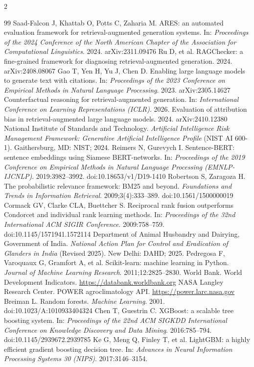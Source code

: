 \documentclass[10pt,openany]{report}
\begin{document}
\begin{multicols}{2}
\begin{thebibliography}{99}
 Saad-Falcon J, Khattab O, Potts C, Zaharia M. ARES: an automated evaluation framework for retrieval-augmented generation systems. In: \emph{Proceedings of the 2024 Conference of the North American Chapter of the Association for Computational Linguistics}. 2024. arXiv:2311.09476
 Ru D, et al. RAGChecker: a fine-grained framework for diagnosing retrieval-augmented generation. 2024. arXiv:2408.08067
 Gao T, Yen H, Yu J, Chen D. Enabling large language models to generate text with citations. In: \emph{Proceedings of the 2023 Conference on Empirical Methods in Natural Language Processing}. 2023. arXiv:2305.14627
 Counterfactual reasoning for retrieval-augmented generation. In: \emph{International Conference on Learning Representations (ICLR)}. 2026.
 Evaluation of attribution bias in retrieval-augmented large language models. 2024. arXiv:2410.12380
 National Institute of Standards and Technology. \emph{Artificial Intelligence Risk Management Framework: Generative Artificial Intelligence Profile} (NIST AI 600-1). Gaithersburg, MD: NIST; 2024.
 Reimers N, Gurevych I. Sentence-BERT: sentence embeddings using Siamese BERT-networks. In: \emph{Proceedings of the 2019 Conference on Empirical Methods in Natural Language Processing (EMNLP-IJCNLP)}. 2019:3982--3992. doi:10.18653/v1/D19-1410
 Robertson S, Zaragoza H. The probabilistic relevance framework: BM25 and beyond. \emph{Foundations and Trends in Information Retrieval}. 2009;3(4):333--389. doi:10.1561/1500000019
 Cormack GV, Clarke CLA, Buettcher S. Reciprocal rank fusion outperforms Condorcet and individual rank learning methods. In: \emph{Proceedings of the 32nd International ACM SIGIR Conference}. 2009:758--759. doi:10.1145/1571941.1572114
 Department of Animal Husbandry and Dairying, Government of India. \emph{National Action Plan for Control and Eradication of Glanders in India} (Revised 2025). New Delhi: DAHD; 2025.
 Pedregosa F, Varoquaux G, Gramfort A, et al. Scikit-learn: machine learning in Python. \emph{Journal of Machine Learning Research}. 2011;12:2825--2830.
 World Bank. World Development Indicators. \url{https://databank.worldbank.org}
 NASA Langley Research Center. POWER agroclimatology API. \url{https://power.larc.nasa.gov}
 Breiman L. Random forests. \emph{Machine Learning}. 2001. doi:10.1023/A:1010933404324
 Chen T, Guestrin C. XGBoost: a scalable tree boosting system. In: \emph{Proceedings of the 22nd ACM SIGKDD International Conference on Knowledge Discovery and Data Mining}. 2016:785--794. doi:10.1145/2939672.2939785
 Ke G, Meng Q, Finley T, et al. LightGBM: a highly efficient gradient boosting decision tree. In: \emph{Advances in Neural Information Processing Systems 30 (NIPS)}. 2017:3146--3154.
\end{thebibliography}
\end{multicols}
\end{document}

